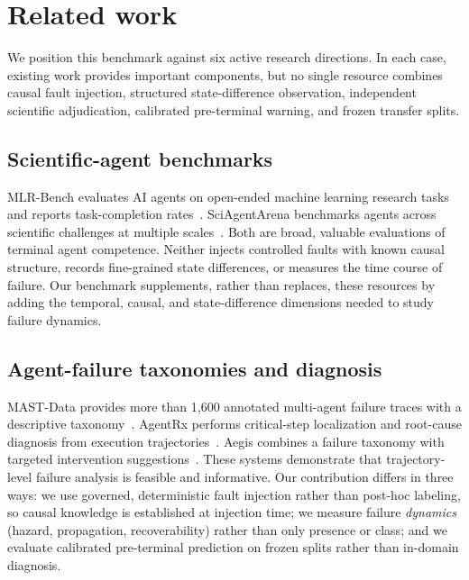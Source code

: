 \section{Related work}
\label{sec:related_work}

We position this benchmark against six active research directions. In each
case, existing work provides important components, but no single resource
combines causal fault injection, structured state-difference observation,
independent scientific adjudication, calibrated pre-terminal warning, and
frozen transfer splits.

\subsection{Scientific-agent benchmarks}

MLR-Bench evaluates AI agents on open-ended machine learning research tasks
and reports task-completion rates~\citep{mlrbench2025}. SciAgentArena
benchmarks agents across scientific challenges at multiple
scales~\citep{sciagentarena2026}. Both are broad, valuable evaluations of
terminal agent competence. Neither injects controlled faults with known
causal structure, records fine-grained state differences, or measures the
time course of failure. Our benchmark supplements, rather than replaces,
these resources by adding the temporal, causal, and state-difference
dimensions needed to study failure dynamics.

\subsection{Agent-failure taxonomies and diagnosis}

MAST-Data provides more than 1{,}600 annotated multi-agent failure traces
with a descriptive taxonomy~\citep{mast2025}. AgentRx performs critical-step
localization and root-cause diagnosis from execution
trajectories~\citep{agentrx2026}. Aegis combines a failure taxonomy with
targeted intervention suggestions~\citep{aegis2025}. These systems
demonstrate that trajectory-level failure analysis is feasible and
informative. Our contribution differs in three ways: we use governed,
deterministic fault injection rather than post-hoc labeling, so causal
knowledge is established at injection time; we measure failure \emph{dynamics}
(hazard, propagation, recoverability) rather than only presence or class;
and we evaluate calibrated pre-terminal prediction on frozen splits rather
than in-domain diagnosis.

